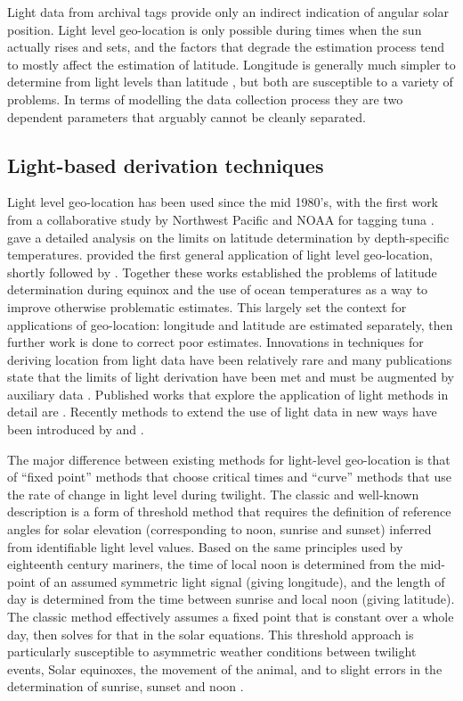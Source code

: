 \documentclass[10pt]{article}
\begin{document}
Light data from archival tags provide only an indirect indication of
angular solar position. Light level geo-location is only possible
during times when the sun actually rises and sets, and the factors
that degrade the estimation process tend to mostly affect the
estimation of latitude.  Longitude is generally much simpler to
determine from light levels than latitude \cite{HB01}, but both are
susceptible to a variety of problems. In terms of modelling the data
collection process they are two dependent parameters that arguably
cannot be cleanly separated.

\subsection{Light-based derivation techniques}
\label{sec:lighttech}
Light level geo-location has been used since the mid 1980's, with the
first work from a collaborative study by Northwest Pacific and NOAA
for tagging tuna \cite{SGNOAA86,HAB86}. \cite{SGNOAA86} gave a
detailed analysis on the limits on latitude determination by
depth-specific temperatures. \cite{WDRCN92} provided the first general
application of light level geo-location, shortly followed by
\cite{H94}. Together these works established the problems of latitude
determination during equinox and the use of ocean temperatures as a
way to improve otherwise problematic estimates. This largely set the
context for applications of geo-location: longitude and latitude are
estimated separately, then further work is done to correct poor
estimates. Innovations in techniques for deriving location from light
data have been relatively rare and many publications state that the
limits of light derivation have been met and must be augmented by
auxiliary data \cite{BM02,BBTW03,TBBW04,STAH05}. Published works that
explore the application of light methods in detail are
\cite{WDRCN92,Welch1999,MBCG01}.  Recently methods to extend the use
of light data in new ways have been introduced by
\cite{sibert2007sml,Ekstrom2007} and \cite{evans2008report}.

The major difference between existing methods for light-level
geo-location is that of ``fixed point'' methods that choose critical
times and ``curve'' methods that use the rate of change in light level
during twilight.  The classic and well-known description is a form of
threshold method that requires the definition of reference angles for
solar elevation (corresponding to noon, sunrise and sunset) inferred
from identifiable light level values. Based on the same principles
used by eighteenth century mariners, the time of local noon is
determined from the mid-point of an assumed symmetric light signal
(giving longitude), and the length of day is determined from the time
between sunrise and local noon (giving latitude). The classic method
effectively assumes a fixed point that is constant over a whole day,
then solves for that in the solar equations. This threshold approach
is particularly susceptible to asymmetric weather conditions between
twilight events, Solar equinoxes, the movement of the animal, and to
slight errors in the determination of sunrise, sunset and noon
\cite{HB01,Ekstrom}.
\end{document}
